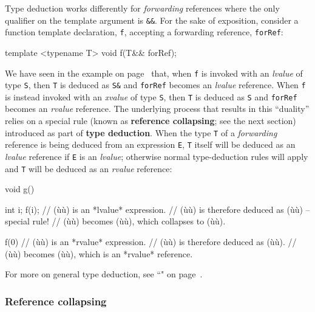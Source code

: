 \noindent Type deduction works differently for \emph{forwarding} references
where the only qualifier on the template argument is \texttt{\&\&}. For
the sake of exposition, consider a function template declaration,
\texttt{f}, accepting a forwarding reference, \texttt{forRef}:

\begin{emcppslisting}
template <typename T> void f(T&& forRef);
\end{emcppslisting}

\noindent We have seen in the example on page~\pageref{f-invoked-example} that,
when \texttt{f} is invoked with an
\emph{lvalue} of type \texttt{S}, then \texttt{T} is deduced as
\texttt{S\&} and \texttt{forRef} becomes an \emph{lvalue} reference.
When \texttt{f} is instead invoked with an \emph{xvalue} of type
\texttt{S}, then \texttt{T} is deduced as \texttt{S} and
\texttt{forRef} becomes an \emph{rvalue} reference. The underlying
process that results in this ``duality'' relies on a special rule (known
as \textbf{reference collapsing}; see the next section) introduced as part of
\textbf{type deduction}. When the type \texttt{T} of a
\emph{forwarding} reference is being deduced from an expression
\texttt{E}, \texttt{T} itself will be deduced as an \emph{lvalue}
reference if \texttt{E} is an \emph{lvalue}; otherwise normal
type-deduction rules will apply and \texttt{T} will be deduced as an \emph{rvalue}
reference:

\begin{emcppslisting}
void g()
{
    int i;
    f(i);  // (ù{}ù) is an *lvalue* expression.
           // (ù{}ù) is therefore deduced as (ù{}ù) -- special rule!
           // (ù{}ù) becomes (ù{}ù), which collapses to (ù{}ù).

    f(0)  // (ù{}ù) is an *rvalue* expression.
          // (ù{}ù) is therefore deduced as (ù{}ù).
          // (ù{}ù) becomes (ù{}ù), which is an *rvalue* reference.
}
\end{emcppslisting}

\noindent For more on general type deduction, see ``" on page~\pageref{auto-feature}.

\subsubsection[Reference collapsing]{Reference collapsing}\label{reference-collapsing}

